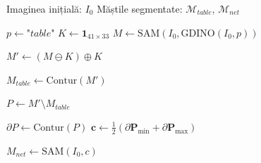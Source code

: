 \begin{algorithm}
\caption{Detectarea și segmentarea mesei și a fileului de tenis.}
\label{alg:table}
\begin{algorithmic}[1]
    \Require Imaginea inițială: \(I_0\)
    \Ensure Măștile segmentate: \(\mathcal{M}_{table}\), \(\mathcal{M}_{net}\)

    \State $p \gets\textit{"table"} $
    \State $K \gets \mathbf 1_{41\times 33}$
    \vspace{0.3em}
    \State
    $M \gets \mathrm{SAM}(I_0, \mathrm{GDINO}(I_0, p))$
    
    \vspace{0.3em}
    \State 
    $M' \gets (M \ominus K)\oplus K$
    \vspace{0.3em}
    
    \State 
    $M_{table} \gets \mathrm{Contur}(M')$
    \vspace{0.3em}

    \State 
      \(P \gets M' \setminus M_{table}\)
    \vspace{0.3em}
    
    \State 
    $\partial P \gets \mathrm{Contur}(P)$
    \State $\mathbf{c} \gets \frac{1}{2} \left( \partial \mathbf{P}_{\min} + \partial\mathbf{P}_{\max} \right)$

    \vspace{0.3em}
    \State 
    $M_{net} \gets \mathrm{SAM}(I_0, c)$
    
\end{algorithmic}
\end{algorithm}


